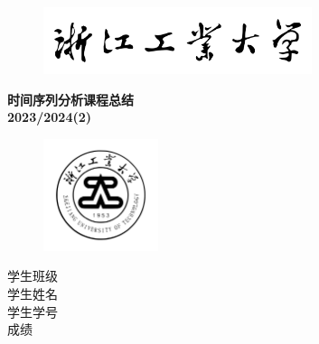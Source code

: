\documentclass{article} %
\begin{document}
\begin{titlepage}
    \begin{center}
        \begin{figure}[H]
            \centering
            \includegraphics[width=0.7\textwidth]{./pic/校名.pdf}
          \end{figure} 
          \huge \textbf{时间序列分析课程总结} \\ 
          \large \textbf{2023/2024(2)}
          \vspace{1cm}
          \begin{figure}[H]
            \centering
            \includegraphics[width=0.3\textwidth]{./pic/校徽.pdf}
          \end{figure}

          \vspace{2.3cm}

          \large 学生班级\hspace{0.5cm}\underline{} \\
          \vspace{0.2cm}
            \large 学生姓名\hspace{0.5cm}\underline{} \\
            \vspace{0.2cm}
            \large 学生学号\hspace{0.5cm}\underline{} \\ 
            \vspace{0.2cm}
            \large 成\quad 绩 \hspace{0.8cm}\underline{\makebox[5.5cm]{}} \\ 
            \vspace{2.5cm}
            \Large {}
        \end{center}
\end{titlepage}
\end{document}

